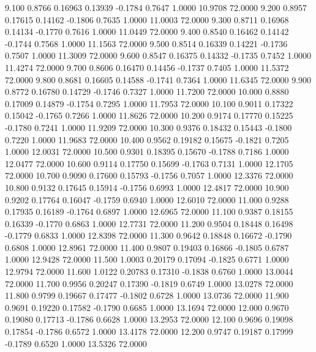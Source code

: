   9.100   0.8766   0.16963   0.13939  -0.1784   0.7647   1.0000  10.9708  72.0000
   9.200   0.8957   0.17615   0.14162  -0.1806   0.7635   1.0000  11.0003  72.0000
   9.300   0.8711   0.16968   0.14134  -0.1770   0.7616   1.0000  11.0449  72.0000
   9.400   0.8540   0.16462   0.14142  -0.1744   0.7568   1.0000  11.1563  72.0000
   9.500   0.8514   0.16339   0.14221  -0.1736   0.7507   1.0000  11.3009  72.0000
   9.600   0.8547   0.16375   0.14332  -0.1735   0.7452   1.0000  11.4274  72.0000
   9.700   0.8606   0.16470   0.14456  -0.1737   0.7405   1.0000  11.5372  72.0000
   9.800   0.8681   0.16605   0.14588  -0.1741   0.7364   1.0000  11.6345  72.0000
   9.900   0.8772   0.16780   0.14729  -0.1746   0.7327   1.0000  11.7200  72.0000
  10.000   0.8880   0.17009   0.14879  -0.1754   0.7295   1.0000  11.7953  72.0000
  10.100   0.9011   0.17322   0.15042  -0.1765   0.7266   1.0000  11.8626  72.0000
  10.200   0.9174   0.17770   0.15225  -0.1780   0.7241   1.0000  11.9209  72.0000
  10.300   0.9376   0.18432   0.15443  -0.1800   0.7220   1.0000  11.9683  72.0000
  10.400   0.9562   0.19182   0.15675  -0.1821   0.7205   1.0000  12.0031  72.0000
  10.500   0.9301   0.18395   0.15670  -0.1788   0.7186   1.0000  12.0477  72.0000
  10.600   0.9114   0.17750   0.15699  -0.1763   0.7131   1.0000  12.1705  72.0000
  10.700   0.9090   0.17600   0.15793  -0.1756   0.7057   1.0000  12.3376  72.0000
  10.800   0.9132   0.17645   0.15914  -0.1756   0.6993   1.0000  12.4817  72.0000
  10.900   0.9202   0.17764   0.16047  -0.1759   0.6940   1.0000  12.6010  72.0000
  11.000   0.9288   0.17935   0.16189  -0.1764   0.6897   1.0000  12.6965  72.0000
  11.100   0.9387   0.18155   0.16339  -0.1770   0.6863   1.0000  12.7731  72.0000
  11.200   0.9504   0.18448   0.16498  -0.1779   0.6833   1.0000  12.8398  72.0000
  11.300   0.9642   0.18848   0.16672  -0.1790   0.6808   1.0000  12.8961  72.0000
  11.400   0.9807   0.19403   0.16866  -0.1805   0.6787   1.0000  12.9428  72.0000
  11.500   1.0003   0.20179   0.17094  -0.1825   0.6771   1.0000  12.9794  72.0000
  11.600   1.0122   0.20783   0.17310  -0.1838   0.6760   1.0000  13.0044  72.0000
  11.700   0.9956   0.20247   0.17390  -0.1819   0.6749   1.0000  13.0278  72.0000
  11.800   0.9799   0.19667   0.17477  -0.1802   0.6728   1.0000  13.0736  72.0000
  11.900   0.9691   0.19220   0.17582  -0.1790   0.6685   1.0000  13.1694  72.0000
  12.000   0.9670   0.19080   0.17713  -0.1786   0.6628   1.0000  13.2953  72.0000
  12.100   0.9696   0.19098   0.17854  -0.1786   0.6572   1.0000  13.4178  72.0000
  12.200   0.9747   0.19187   0.17999  -0.1789   0.6520   1.0000  13.5326  72.0000

